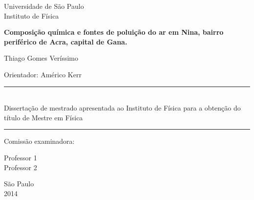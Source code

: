 \begin{titlepage}
\setlength{\voffset}{0pt}
\setlength{\hoffset}{0pt}
\centering
\Large{Universidade de São Paulo \\
Instituto de Física}

\LARGE{\bf Composição química e fontes de poluição do ar em Nina, bairro periférico de Acra, capital de Gana.
}


\Large{ Thiago Gomes Veríssimo
}


\begin{flushright}

\begin{minipage}{.6\textwidth}
\large{Orientador: Américo Kerr
}
\end{minipage}


\begin{minipage}{.6\textwidth}
\rule{\linewidth}{0.5mm}\\
\large{
Dissertação de mestrado apresentada ao Instituto de Física para a obtenção do 
título de Mestre em Física
}

\rule{\linewidth}{0.5mm}
\end{minipage}
\end{flushright}


\begin{flushleft}

\normalsize
Comissão examinadora:\\
\hspace{.03\textwidth}\begin{minipage}{.97\textwidth}
Professor 1 \\
Professor 2
\end{minipage}
\end{flushleft}


São Paulo\\
2014

\end{titlepage}

